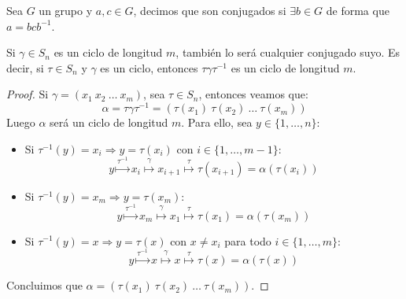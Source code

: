 \begin{definicion}
    Sea $G$ un grupo y $a,c\in G$, decimos que son conjugados si $\exists b \in G$ de forma que $a = bcb^{-1}$.
\end{definicion}

\begin{prop}\label{prop:conjugar_ciclos}
    Si $\gamma\in S_n$ es un ciclo de longitud $m$, también lo será cualquier conjugado suyo. Es decir, si $\tau\in S_n$ y $\gamma$ es un ciclo, entonces $\tau\gamma\tau^{-1}$ es un ciclo de longitud $m$.
    \begin{proof}
        Si $\gamma=(x_1\ x_2\ \ldots\ x_m)$, sea $\tau \in S_n$, entonces veamos que:
        \begin{equation*}
            \alpha = \tau \gamma\tau^{-1} = (\tau(x_1)\ \tau(x_2)\ \ldots\ \tau(x_m))
        \end{equation*}
        Luego $\alpha$ será un ciclo de longitud $m$. Para ello, sea $y\in \{1,\ldots,n\}$:
        \begin{itemize}
            \item Si $\tau^{-1}(y) = x_i\Longrightarrow y=\tau(x_i)$ con $i \in \{1,\ldots,m-1\}$:
                \begin{equation*}
                    y \stackrel{\tau^{-1}}{\longmapsto} x_i \stackrel{\gamma}{\longmapsto} x_{i+1} \stackrel{\tau}{\longmapsto} \tau(x_{i+1}) = \alpha(\tau(x_i))
                \end{equation*}
            \item Si $\tau^{-1}(y) = x_{m}\Longrightarrow y=\tau(x_m)$:
                \begin{equation*}
                    y \stackrel{\tau^{-1}}{\longmapsto} x_m \stackrel{\gamma}{\longmapsto} x_1 \stackrel{\tau}{\longmapsto} \tau(x_1) = \alpha(\tau(x_m))
                \end{equation*}
            \item Si $\tau^{-1}(y) = x\Longrightarrow y=\tau(x)$ con $x\neq x_i$ para todo $i \in \{1,\ldots,m\}$:
                \begin{equation*}
                    y \stackrel{\tau^{-1}}{\longmapsto} x \stackrel{\gamma}{\longmapsto} x \stackrel{\tau}{\longmapsto} \tau(x) = \alpha(\tau(x))
                \end{equation*}
        \end{itemize}
        Concluimos que $\alpha = (\tau(x_1)\ \tau(x_2)\ \ldots\ \tau(x_m))$.
    \end{proof}
\end{prop}

